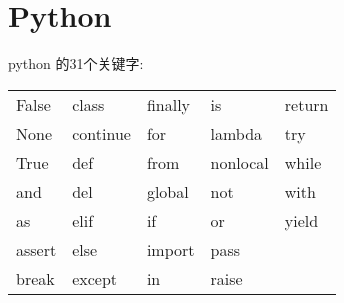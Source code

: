 \chapter{Python}
python 的31个关键字:

\centering
\begin{tabular}{lllll}
 False & class & finally & is & return\\
 None & continue & for & lambda & try\\
 True & def & from & nonlocal & while\\
 and & del & global & not & with\\
 as & elif & if & or & yield\\
 assert & else & import & pass & \\
 break & except & in & raise & 
\end{tabular}
